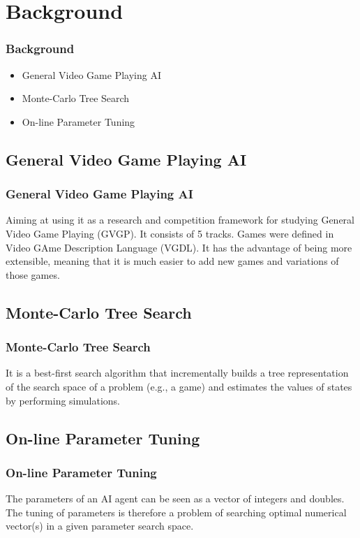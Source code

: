 \documentclass{beamer}
\begin{document}

\section{Background}
\begin{frame}
  \frametitle{Background}
  \begin{itemize}
    \item General Video Game Playing AI
    \item Monte-Carlo Tree Search
    \item On-line Parameter Tuning
  \end{itemize}
  

\end{frame}


\subsection{General Video Game Playing AI}
\begin{frame}
\frametitle{General Video Game Playing AI}
Aiming at using it as a research and competition framework for studying General Video Game Playing (GVGP). It consists of 5 tracks. Games were defined in Video GAme Description Language (VGDL). It has the advantage of being more extensible, meaning that it is much easier to add new games and variations of those games.
\end{frame}

\subsection{Monte-Carlo Tree Search}
\begin{frame}
\frametitle{Monte-Carlo Tree Search}
It is a best-first search algorithm that incrementally builds a tree representation of the search space of a problem (e.g., a game) and estimates the values of states by performing simulations\cite{1}.
\end{frame}

\subsection{On-line Parameter Tuning}
\begin{frame}
\frametitle{On-line Parameter Tuning\cite{10}}
The parameters of an AI agent can be seen as a vector of integers and doubles. The tuning of parameters is therefore a problem of searching optimal numerical vector(s) in a given parameter search space. %
\end{frame}
\end{document}
